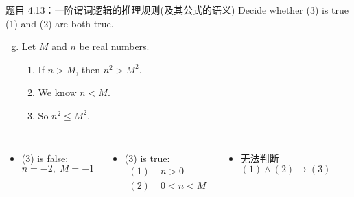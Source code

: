 \begin{frame}{}
  \begin{exampleblock}{题目 4.13：一阶谓词逻辑的推理规则(及其公式的语义)}
    Decide whether (3) is true  (1) and (2) are both true.

    \begin{enumerate}[(a)]
      \setcounter{enumi}{6}
      \item Let $M$ and $n$ be real numbers.
	\begin{enumerate}[(1)]
	  \item If $n > M$, then $n^2 > M^2$.
	  \item We know $n < M$.
	  \item So $n^2 \le M^2$.
	\end{enumerate}
    \end{enumerate}
  \end{exampleblock}

  \begin{columns}[t]
    \pause
      \begin{itemize}
	\item (3) is false: 
	  \[
	    n = -2, \; M = -1
	  \]
      \end{itemize}
    \pause
      \begin{itemize}
        \item (3) is true:
	\begin{align*}
	  (1)\; & n > 0 \\
	  (2)\; & 0 < n < M
	\end{align*}
      \end{itemize}
    \pause
      \begin{itemize}
        \item 无法判断
	\[
	  (1) \land (2) \to (3)
	\]
      \end{itemize}
  \end{columns}
  \pause
  \begin{columns}
  \end{columns}
\end{frame}

